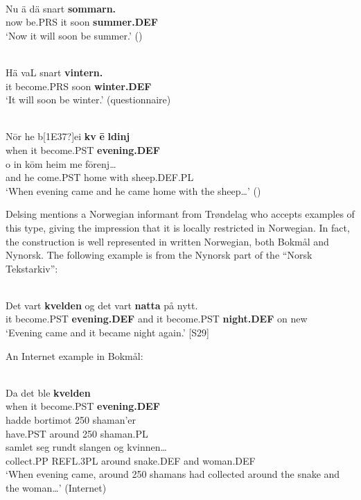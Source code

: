 \ea \label{} 
\\
\gll Nu  ä  dä  snart  \textbf{sommarn.}\\
now  be.PRS  it  soon  \textbf{summer.DEF}\\
\glt ‘Now it will soon be summer.’ (\citet{Broberg1936})

\z

\ea \label{} 
\\
\gll Hä  vaL  snart  \textbf{vintern.}\\
it  become.PRS  soon  \textbf{winter.DEF}\\
\glt ‘It will soon be winter.’ (questionnaire)

\z

\ea \label{} 
\\
\gll N\=or  he  b[1E37?]ei  \textbf{kv} \textbf{\=e} \textbf{ldinj}\\
when  it  become.PST  \textbf{evening.DEF}\\
\gll o  in  k\=om  heim  me  f\=orenj…\\
and  he  come.PST  home  with  sheep.DEF.PL\\
\glt ‘When evening came and he came home with the sheep…’ (\citet[38]{Lundell1936})

\z

Delsing mentions a Norwegian informant from Trøndelag who accepts examples of this type, giving the impression that it is locally restricted in Norwegian. In fact, the construction is well represented in written Norwegian, both Bokmål and Nynorsk. The following example is from the Nynorsk part of the “Norsk Tekstarkiv”: 

\ea \label{} 
\\
\gll Det vart  \textbf{kvelden} og  det  vart  \textbf{natta} på  nytt.\\ %
it  become.PST  \textbf{evening.DEF} and  it  become.PST  \textbf{night.DEF} on  new\\
\glt ‘Evening came and it became night again.’ [S29]

\z

An Internet example in Bokmål: 


\ea \label{} 
\\
\gll Da  det  ble  \textbf{kvelden} \\
when  it  become.PST  \textbf{evening.DEF} \\
\gll hadde  bortimot  250  shaman’er\\
have.PST  around  250  shaman.PL\\
\gll samlet  seg  rundt  slangen  og  kvinnen…\\
collect.PP  REFL.3PL  around  snake.DEF  and  woman.DEF\\
\glt ‘When evening came, around 250 shamans had collected around the snake and the woman…’ (Internet)

